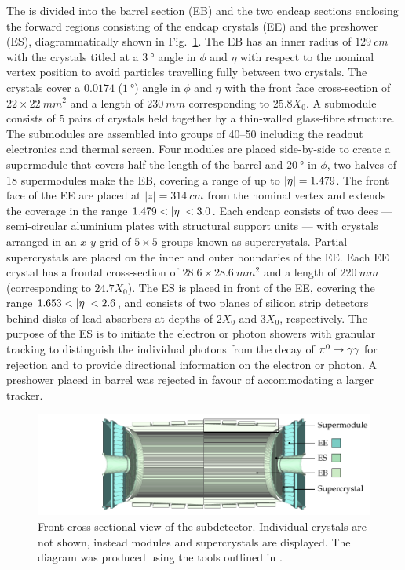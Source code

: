 The \ECAL is divided into the barrel section (EB) and the two endcap sections
enclosing the forward regions consisting of the endcap crystals (EE) and the
preshower (ES), diagrammatically shown in Fig.~\ref{fig:cms-ecal}. The EB has an inner
radius of ${\SI{129}{cm}}$ with the crystals titled at a ${\SI{3}{\degree}}$
angle in $\phi$ and $\eta$ with respect to the nominal vertex position to
avoid particles travelling fully between two crystals. The crystals cover a
$0.0174$ (${\SI{1}{\degree}}$) angle in $\phi$ and $\eta$ with the front face
cross-section of ${22\times\SI{22}{mm^{2}}}$ and a length of ${\SI{230}{mm}}$
corresponding to $25.8X_0$. A submodule consists of 5 pairs of crystals held
together by a thin-walled glass-fibre structure. The submodules are assembled
into groups of 40--50 including the readout electronics and thermal screen.
Four modules are placed side-by-side to create a supermodule that covers half
the length of the barrel and ${\SI{20}{\degree}}$ in $\phi$, two halves of 18
supermodules make the EB, covering a range of up to ${|\eta|=1.479}$. The front
face of the EE are placed at ${|z|=\SI{314}{cm}}$ from the nominal vertex and
extends the \ECAL coverage in the range ${1.479<\aeta<3.0}$. Each endcap
consists of two dees --- semi-circular aluminium plates with structural
support units --- with crystals arranged in an $x$-$y$ grid of $5\times 5$
groups known as supercrystals. Partial supercrystals are placed on the inner
and outer boundaries of the EE. Each EE crystal has a frontal cross-section
of ${28.6\times\SI{28.6}{mm^{2}}}$ and a length of ${\SI{220}{mm}}$
(corresponding to $24.7X_0$). The ES is placed in front of the EE, covering
the range $1.653<\aeta<2.6$, and consists of two planes of silicon strip
detectors behind disks of lead absorbers at depths of $2X_0$ and $3X_0$,
respectively. The purpose of the ES is to initiate the electron or photon
showers with granular tracking to distinguish the individual photons from the
decay of ${\pi^{0}\rightarrow\gamma\gamma}$ for rejection and to provide directional
information on the electron or photon. A preshower placed in barrel was
rejected in favour of accommodating a larger tracker.

\begin{figure}[htb]
    \centering
    \includegraphics{diagrams/tikz/cms/annotated/cms_ecal.pdf}
    \caption[Front cross-section of the ECAL subdetector]{
        Front cross-sectional view of the \ECAL subdetector. Individual
        crystals are not shown, instead modules and supercrystals are
        displayed. The diagram was produced using the tools outlined in
        \cite{Sakuma:2013jqa}.
    }
    \label{fig:cms-ecal}
\end{figure}

